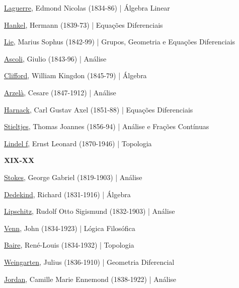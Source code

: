 \documentclass[12pt,a4paper]{article}
\begin{document}
			\href{http://en.wikipedia.org/wiki/Laguerre}{Laguerre}, Edmond Nicolas (1834-86) | \'Algebra Linear

			\href{http://en.wikipedia.org/wiki/Hankel}{Hankel}, Hermann (1839-73) | Equa\c{c}\~oes Diferenciais

			\href{http://en.wikipedia.org/wiki/Sophus_Lie}{Lie}, Marius Sophus (1842-99) | Grupos, Geometria e Equa\c{c}\~oes Diferenciais

			\href{http://en.wikipedia.org/wiki/Giulio_Ascoli}{Ascoli}, Giulio (1843-96) | An\'alise

			\href{http://en.wikipedia.org/wiki/William_Kingdon_Clifford}{Clifford}, William Kingdon (1845-79) | \'Algebra

			\href{http://pt.wikipedia.org/wiki/Cesare_Arzel\%C3\%A0}{Arzel\`a}, Cesare (1847-1912) | An\'alise

			\href{http://en.wikipedia.org/wiki/Carl_Gustav_Axel_Harnack}{Harnack}, Carl Gustav Axel (1851-88) | Equa\c{c}\~oes Diferenciais

			\href{http://en.wikipedia.org/wiki/Stieltjes}{Stieltjes}, Thomas Joannes (1856-94) | An\'alise e Fra\c{c}\~oes Cont\'inuas

			\href{http://en.wikipedia.org/wiki/Ernst_Leonard_Lindel\%C3\%B6f}{Lindel f}, Ernst Leonard (1870-1946) | Topologia

			\begin{flushright}
			\end{flushright}

			\textbf{XIX-XX}

			\href{http://pt.wikipedia.org/wiki/George_Gabriel_Stokes}{Stokes}, George Gabriel (1819-1903) | An\'alise

			\href{http://pt.wikipedia.org/wiki/Richard_Dedekind}{Dedekind}, Richard (1831-1916) | \'Algebra

			\href{http://pt.wikipedia.org/wiki/Rudolf_Lipschitz}{Lipschitz}, Rudolf Otto Sigismund (1832-1903) | An\'alise

			\href{http://en.wikipedia.org/wiki/John_Venn}{Venn}, John (1834-1923) | L\'ogica Filos\'ofica

			\href{http://en.wikipedia.org/wiki/Baire}{Baire}, Ren\'e-Louis (1834-1932) | Topologia

			\href{http://en.wikipedia.org/wiki/Julius_Weingarten}{Weingarten}, Julius (1836-1910) | Geometria Diferencial

			\href{http://pt.wikipedia.org/wiki/Camille_Jordan}{Jordan}, Camille Marie Ennemond (1838-1922) | An\'alise
\end{document}
